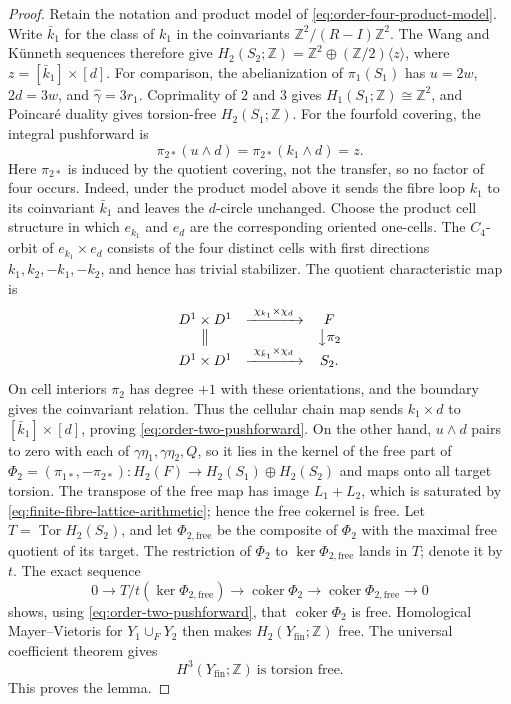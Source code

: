 \documentclass[11pt]{article}
\theoremstyle{definition}
\theoremstyle{remark}
\numberwithin{equation}{section}
\begin{document}
\begin{proof}
Retain the notation and product model of
\eqref{eq:order-four-product-model}.
Write $\bar k_1$ for the class of $k_1$ in the coinvariants
$\mathbb Z^2/(R-I)\mathbb Z^2$.  The Wang and K\"unneth sequences
therefore give
$H_2(S_2;\mathbb Z)=\mathbb Z^2\oplus
(\mathbb Z/2)\langle z\rangle$, where
$z=[\bar k_1]\times[d]$.
For comparison, the abelianization of $\pi_1(S_1)$ has
$u=2w$, $2d=3w$, and $\widehat\gamma=3r_1$.  Coprimality of $2$ and $3$ gives
$H_1(S_1;\mathbb Z)\cong\mathbb Z^2$, and Poincar\'e duality gives
torsion-free $H_2(S_1;\mathbb Z)$.
For the fourfold covering, the integral pushforward is
\begin{equation}\label{eq:order-two-pushforward}
 \pi_{2*}(u\wedge d)
 =\pi_{2*}(k_1\wedge d)=z.
\end{equation}
Here $\pi_{2*}$ is induced by the quotient covering, not the transfer, so
no factor of four occurs.  Indeed, under the product model above it sends the
fibre loop $k_1$ to its coinvariant $\bar k_1$ and leaves the $d$-circle
unchanged.  Choose the product cell structure in which $e_{k_1}$ and
$e_d$ are the corresponding oriented one-cells.  The $C_4$-orbit of
$e_{k_1}\times e_d$ consists of the four distinct cells with first
directions $k_1,k_2,-k_1,-k_2$, and hence has trivial stabilizer.  The
quotient characteristic map is
\[
 \begin{array}{ccc}
 D^1\times D^1&
 \xrightarrow{\ \chi_{k_1}\times\chi_d\ }&F\\
 \big\Vert&&\big\downarrow{\pi_2}\\
 D^1\times D^1&
 \xrightarrow{\ \chi_{\bar k_1}\times\chi_d\ }&S_2 .
 \end{array}
\]
On cell interiors $\pi_2$ has degree $+1$ with these orientations, and
the boundary gives the coinvariant relation.  Thus the cellular chain map
sends $k_1\times d$ to $[\bar k_1]\times[d]$, proving
\eqref{eq:order-two-pushforward}.
On the other hand, $u\wedge d$ pairs to zero with each of
$\gamma\eta_1,\gamma\eta_2,Q$, so it lies in the kernel of the free part of
$\Phi_2=(\pi_{1*},-\pi_{2*}):H_2(F)\to H_2(S_1)\oplus H_2(S_2)$
and maps onto all target torsion.  The transpose of the free map has image
$L_1+L_2$, which is saturated by
\eqref{eq:finite-fibre-lattice-arithmetic}; hence the free cokernel is
free.  Let $T=\operatorname{Tor}H_2(S_2)$, and let
$\Phi_{2,\mathrm{free}}$ be the composite of $\Phi_2$ with the
maximal free quotient of its target.  The restriction of $\Phi_2$ to
$\ker\Phi_{2,\mathrm{free}}$ lands in $T$; denote it by $t$.  The
exact sequence
\[
 0\longrightarrow T/t(\ker\Phi_{2,\mathrm{free}})
 \longrightarrow\operatorname{coker}\Phi_2
 \longrightarrow\operatorname{coker}\Phi_{2,\mathrm{free}}
 \longrightarrow0
\]
shows, using \eqref{eq:order-two-pushforward}, that
$\operatorname{coker}\Phi_2$ is free.  Homological
Mayer--Vietoris for $Y_1\cup_F Y_2$ then makes
$H_2(Y_{\mathrm{fin}};\mathbb Z)$ free.  The universal coefficient theorem gives
\begin{equation}\label{eq:H3-B-torsion-free}
 H^3(Y_{\mathrm{fin}};\mathbb Z)\ \text{is torsion free}.
\end{equation}
This proves the lemma.\qedhere
\end{proof}
\end{document}

